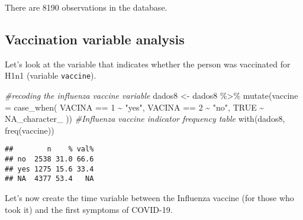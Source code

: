 \documentclass[
]{article}
\newenvironment{Shaded}{\begin{snugshade}}{\end{snugshade}}
\newcommand{\AttributeTok}[1]{\textcolor[rgb]{0.77,0.63,0.00}{#1}}
\newcommand{\CommentTok}[1]{\textcolor[rgb]{0.56,0.35,0.01}{\textit{#1}}}
\newcommand{\ConstantTok}[1]{\textcolor[rgb]{0.00,0.00,0.00}{#1}}
\newcommand{\DecValTok}[1]{\textcolor[rgb]{0.00,0.00,0.81}{#1}}
\newcommand{\FunctionTok}[1]{\textcolor[rgb]{0.00,0.00,0.00}{#1}}
\newcommand{\NormalTok}[1]{#1}
\newcommand{\OtherTok}[1]{\textcolor[rgb]{0.56,0.35,0.01}{#1}}
\newcommand{\SpecialCharTok}[1]{\textcolor[rgb]{0.00,0.00,0.00}{#1}}
\newcommand{\StringTok}[1]{\textcolor[rgb]{0.31,0.60,0.02}{#1}}
\begin{document}
There are 8190 observations in the database.

\hypertarget{vaccination-variable-analysis}{%
\subsection{Vaccination variable
analysis}\label{vaccination-variable-analysis}}

Let's look at the variable that indicates whether the person was
vaccinated for H1n1 (variable \texttt{vaccine}).

\begin{Shaded}
\begin{Highlighting}[]
\CommentTok{\#recoding the influenza vaccine variable}
\NormalTok{dados8 }\OtherTok{\textless{}{-}}\NormalTok{ dados8 }\SpecialCharTok{\%\textgreater{}\%} 
  \FunctionTok{mutate}\NormalTok{(}\AttributeTok{vaccine =} \FunctionTok{case\_when}\NormalTok{(}
\NormalTok{    VACINA }\SpecialCharTok{==} \DecValTok{1} \SpecialCharTok{\textasciitilde{}} \StringTok{"yes"}\NormalTok{, }
\NormalTok{    VACINA }\SpecialCharTok{==} \DecValTok{2} \SpecialCharTok{\textasciitilde{}} \StringTok{"no"}\NormalTok{,}
    \ConstantTok{TRUE} \SpecialCharTok{\textasciitilde{}} \ConstantTok{NA\_character\_}
\NormalTok{  ))}
\CommentTok{\#Influenza vaccine indicator frequency table}
\FunctionTok{with}\NormalTok{(dados8, }\FunctionTok{freq}\NormalTok{(vaccine))}
\end{Highlighting}
\end{Shaded}

\begin{verbatim}
##        n    % val%
## no  2538 31.0 66.6
## yes 1275 15.6 33.4
## NA  4377 53.4   NA
\end{verbatim}

Let's now create the time variable between the Influenza vaccine (for
those who took it) and the first symptoms of COVID-19.

\begin{Shaded}
\end{Shaded}
\end{document}
